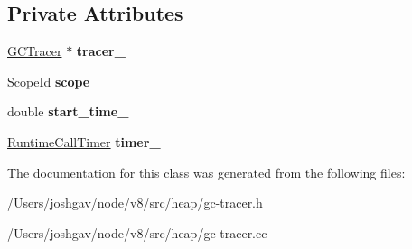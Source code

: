 \subsection*{Private Attributes}
\begin{DoxyCompactItemize}
\item 
\hyperlink{classv8_1_1internal_1_1_g_c_tracer}{G\+C\+Tracer} $\ast$ {\bfseries tracer\+\_\+}\hypertarget{classv8_1_1internal_1_1_g_c_tracer_1_1_scope_afd4c1fb985d42c05663cb3a230377975}{}\label{classv8_1_1internal_1_1_g_c_tracer_1_1_scope_afd4c1fb985d42c05663cb3a230377975}

\item 
Scope\+Id {\bfseries scope\+\_\+}\hypertarget{classv8_1_1internal_1_1_g_c_tracer_1_1_scope_a4ef90f97f77bb4675f2dad3e0988f2e3}{}\label{classv8_1_1internal_1_1_g_c_tracer_1_1_scope_a4ef90f97f77bb4675f2dad3e0988f2e3}

\item 
double {\bfseries start\+\_\+time\+\_\+}\hypertarget{classv8_1_1internal_1_1_g_c_tracer_1_1_scope_af28c3af23366f88e9938a3eadb9a0a4f}{}\label{classv8_1_1internal_1_1_g_c_tracer_1_1_scope_af28c3af23366f88e9938a3eadb9a0a4f}

\item 
\hyperlink{classv8_1_1internal_1_1_runtime_call_timer}{Runtime\+Call\+Timer} {\bfseries timer\+\_\+}\hypertarget{classv8_1_1internal_1_1_g_c_tracer_1_1_scope_aee7e027daff872d9dccc9935b6ffb267}{}\label{classv8_1_1internal_1_1_g_c_tracer_1_1_scope_aee7e027daff872d9dccc9935b6ffb267}

\end{DoxyCompactItemize}


The documentation for this class was generated from the following files\+:\begin{DoxyCompactItemize}
\item 
/\+Users/joshgav/node/v8/src/heap/gc-\/tracer.\+h\item 
/\+Users/joshgav/node/v8/src/heap/gc-\/tracer.\+cc\end{DoxyCompactItemize}

